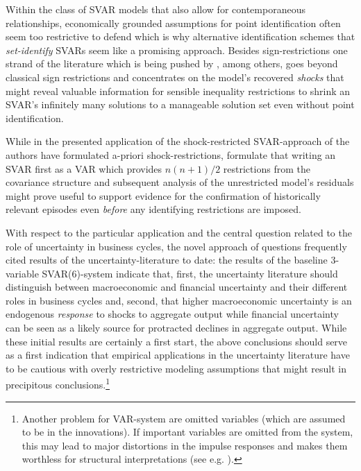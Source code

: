 \documentclass[a4paper,11pt,listof=nochaptergap,oneside,pointednumbers,bibtotoc,bigheadings,liststotoc,hidelinks]{scrbook}
\theoremstyle{mysatz}
\theoremstyle{mydefinition}
\theoremstyle{mytheorem}
\theoremstyle{mybemerkung}
\begin{document}
Within the class of SVAR models that also allow for contemporaneous relationships, economically grounded assumptions for point identification often seem too restrictive to defend which is why alternative identification schemes that \textit{set-identify} \citep{granzieraetal:18} SVARs seem like a promising approach. Besides sign-restrictions one strand of the literature which is being pushed by \citet{ludvigsonetal:17}, among others, goes beyond classical sign restrictions and concentrates on the model's recovered \textit{shocks} that might reveal valuable information for sensible inequality restrictions to shrink an SVAR's infinitely many solutions to a manageable solution set even without point identification. 

While in the presented application of the shock-restricted SVAR-approach of \citet{ludvigsonetal:18} the authors have formulated a-priori shock-restrictions, \citet{ludvigsonetal:17} formulate that writing an SVAR first as a VAR which provides $n(n+1)/2$ restrictions from the covariance structure and subsequent analysis of the unrestricted model's residuals might prove useful to support evidence for the confirmation of historically relevant episodes even \textit{before} any identifying restrictions are imposed.

With respect to the particular application and the central question related to the role of uncertainty in business cycles, the novel approach of \citet{ludvigsonetal:18} questions frequently cited results of the uncertainty-literature to date: the results of the baseline 3-variable SVAR(6)-system indicate that, first, the uncertainty literature should distinguish between macroeconomic and financial uncertainty and their different roles in business cycles and, second, that higher macroeconomic uncertainty is an endogenous \textit{response} to shocks to aggregate output while financial uncertainty can be seen as a likely source for protracted declines in aggregate output. While these initial results are certainly a first start, the above conclusions should serve as a first indication that empirical applications in the uncertainty literature have to be cautious with overly restrictive modeling assumptions that might result in precipitous conclusions.\footnote{Another problem for VAR-system are omitted variables (which are assumed to be in the innovations). If important variables are omitted from the system, this may lead to major distortions in the impulse responses and makes them worthless for structural interpretations (see e.g. \citet{lutkepohl:05}).} \\
\end{document}
